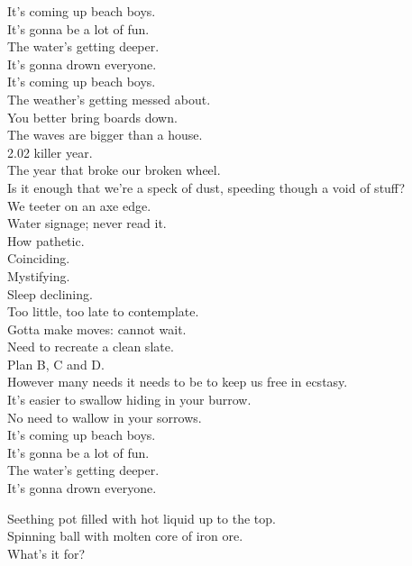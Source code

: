 It's coming up beach boys. \\
It's gonna be a lot of fun. \\
The water's getting deeper. \\
It's gonna drown everyone. \\
It's coming up beach boys. \\
The weather's getting messed about. \\
You better bring boards down. \\
The waves are bigger than a house. \\

2.02 killer year. \\
The year that broke our broken wheel. \\
Is it enough that we're a speck of dust, speeding though a void of stuff? \\
We teeter on an axe edge. \\

Water signage; never read it. \\
How pathetic. \\
Coinciding. \\
Mystifying. \\
Sleep declining. \\
Too little, too late to contemplate. \\
Gotta make moves: cannot wait. \\
Need to recreate a clean slate. \\
Plan B, C and D. \\
However many needs it needs to be to keep us free in ecstasy. \\
It's easier to swallow hiding in your burrow. \\
No need to wallow in your sorrows. \\

It's coming up beach boys. \\
It's gonna be a lot of fun. \\
The water's getting deeper. \\
It's gonna drown everyone. \\




Seething pot filled with hot liquid up to the top. \\
Spinning ball with molten core of iron ore. \\
What's it for? \\

